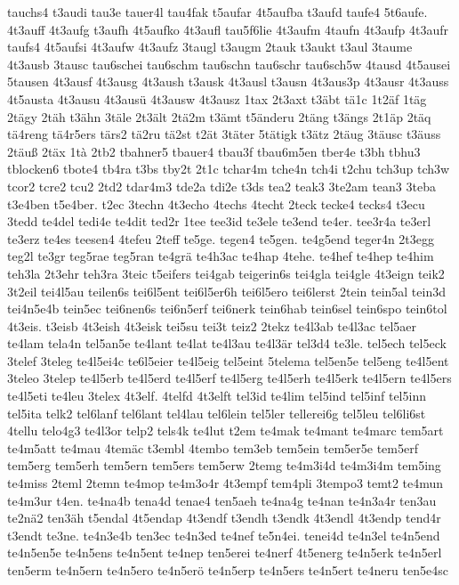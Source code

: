 {tauchs4
t3audi
tau3e
tauer4l
tau4fak
t5aufar
4t5aufba
t3aufd
taufe4
5t6aufe.
4t3auff
4t3aufg
t3aufh
4t5aufko
4t3aufl
tau5f6lie
4t3aufm
4taufn
4t3aufp
4t3aufr
taufs4
4t5aufsi
4t3aufw
4t3aufz
3taugl
t3augm
2tauk
t3aukt
t3aul
3taume
4t3ausb
3tausc
tau6schei
tau6schm
tau6schn
tau6schr
tau6sch5w
4tausd
4t5ausei
5tausen
4t3ausf
4t3ausg
4t3aush
t3ausk
4t3ausl
t3ausn
4t3aus3p
4t3ausr
4t3auss
4t5austa
4t3ausu
4t3ausü
4t3ausw
4t3ausz
1tax
2t3axt
t3äbt
tä1c
1t2äf
1täg
2tägy
2täh
t3ähn
3täle
2t3ält
2tä2m
t3ämt
t5änderu
2täng
t3ängs
2t1äp
2täq
tä4reng
tä4r5ers
tärs2
tä2ru
tä2st
t2ät
3täter
5tätigk
t3ätz
2täug
3täusc
t3äuss
2täuß
2täx
1tà
2tb2
tbahner5
tbauer4
tbau3f
tbau6m5en
tber4e
t3bh
tbhu3
tblocken6
tbote4
tb4ra
t3bs
tby2t
2t1c
tchar4m
tche4n
tch4i
t2chu
tch3up
tch3w
tcor2
tcre2
tcu2
2td2
tdar4m3
tde2a
tdi2e
t3ds
tea2
teak3
3te2am
tean3
3teba
t3e4ben
t5e4ber.
t2ec
3techn
4t3echo
4techs
4techt
2teck
tecke4
tecks4
t3ecu
3tedd
te4del
tedi4e
te4dit
ted2r
1tee
tee3id
te3ele
te3end
te4er.
tee3r4a
te3erl
te3erz
te4es
teesen4
4tefeu
2teff
te5ge.
tegen4
te5gen.
te4g5end
teger4n
2t3egg
teg2l
te3gr
teg5rae
teg5ran
te4grä
te4h3ac
te4hap
4tehe.
te4hef
te4hep
te4him
teh3la
2t3ehr
teh3ra
3teic
t5eifers
tei4gab
teigerin6s
tei4gla
tei4gle
4t3eign
teik2
3t2eil
tei4l5au
teilen6s
tei6l5ent
tei6l5er6h
tei6l5ero
tei6lerst
2tein
tein5al
tein3d
tei4n5e4b
tein5ec
tei6nen6s
tei6n5erf
tei6nerk
tein6hab
tein6sel
tein6spo
tein6tol
4t3eis.
t3eisb
4t3eish
4t3eisk
tei5su
tei3t
teiz2
2tekz
te4l3ab
te4l3ac
tel5aer
te4lam
tela4n
tel5an5e
te4lant
te4lat
te4l3au
te4l3är
tel3d4
te3le.
tel5ech
tel5eck
3telef
3teleg
te4l5ei4c
te6l5eier
te4l5eig
tel5eint
5telema
tel5en5e
tel5eng
te4l5ent
3teleo
3telep
te4l5erb
te4l5erd
te4l5erf
te4l5erg
te4l5erh
te4l5erk
te4l5ern
te4l5ers
te4l5eti
te4leu
3telex
4t3elf.
4telfd
4t3elft
tel3id
te4lim
tel5ind
tel5inf
tel5inn
tel5ita
telk2
tel6lanf
tel6lant
tel4lau
tel6lein
tel5ler
tellerei6g
tel5leu
tel6li6st
4tellu
telo4g3
te4l3or
telp2
tels4k
te4lut
t2em
te4mak
te4mant
te4marc
tem5art
te4m5att
te4mau
4temäc
t3embl
4tembo
tem3eb
tem5ein
tem5er5e
tem5erf
tem5erg
tem5erh
tem5ern
tem5ers
tem5erw
2temg
te4m3i4d
te4m3i4m
tem5ing
te4miss
2teml
2temn
te4mop
te4m3o4r
4t3empf
tem4pli
3tempo3
temt2
te4mun
te4m3ur
t4en.
te4na4b
tena4d
tenae4
ten5aeh
te4na4g
te4nan
te4n3a4r
ten3au
te2nä2
ten3äh
t5endal
4t5endap
4t3endf
t3endh
t3endk
4t3endl
4t3endp
tend4r
t3endt
te3ne.
te4n3e4b
ten3ec
te4n3ed
te4nef
te5n4ei.
tenei4d
te4n3el
te4n5end
te4n5en5e
te4n5ens
te4n5ent
te4nep
ten5erei
te4nerf
4t5energ
te4n5erk
te4n5erl
ten5erm
te4n5ern
te4n5ero
te4n5erö
te4n5erp
te4n5ers
te4n5ert
te4neru
ten5e4sc
}
